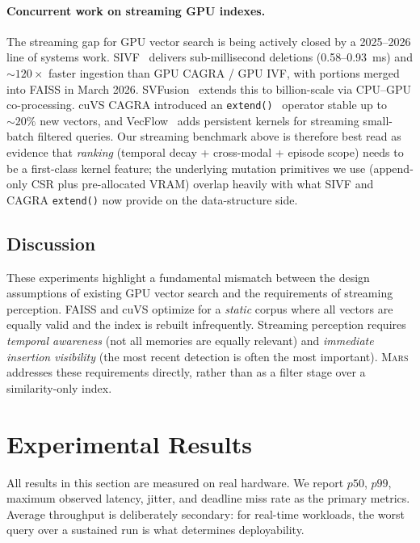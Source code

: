 \documentclass[11pt]{article}
\newcommand{\mars}{\textsc{Mars}}
\begin{document}
\paragraph{Concurrent work on streaming GPU indexes.} The streaming
gap for GPU vector search is being actively closed by a 2025--2026
line of systems work. SIVF~\cite{sivf} delivers sub-millisecond
deletions (0.58--0.93~ms) and ${\sim}120\times$ faster ingestion than
GPU CAGRA / GPU IVF, with portions merged into FAISS in March 2026.
SVFusion~\cite{svfusion} extends this to billion-scale via CPU--GPU
co-processing. cuVS CAGRA introduced an
\texttt{extend()}~\cite{cagra_extend} operator stable up to ${\sim}20\%$
new vectors, and VecFlow~\cite{vecflow} adds persistent kernels for
streaming small-batch filtered queries. Our streaming benchmark above
is therefore best read as evidence that \emph{ranking} (temporal decay
+ cross-modal + episode scope) needs to be a first-class kernel
feature; the underlying mutation primitives we use (append-only CSR
plus pre-allocated VRAM) overlap heavily with what SIVF and CAGRA
\texttt{extend()} now provide on the data-structure side.

\subsection{Discussion}

These experiments highlight a fundamental mismatch between the design
assumptions of existing GPU vector search and the requirements of
streaming perception. FAISS and cuVS optimize for a \emph{static} corpus
where all vectors are equally valid and the index is rebuilt
infrequently. Streaming perception requires \emph{temporal awareness}
(not all memories are equally relevant) and \emph{immediate insertion
visibility} (the most recent detection is often the most important).
\mars{} addresses these requirements directly, rather than as a
filter stage over a similarity-only index.

\section{Experimental Results}
\label{sec:results}

All results in this section are measured on real hardware. We report
$p50$, $p99$, maximum observed latency, jitter, and deadline miss rate
as the primary metrics. Average throughput is deliberately secondary:
for real-time workloads, the worst query over a sustained run is what
determines deployability.
\end{document}

